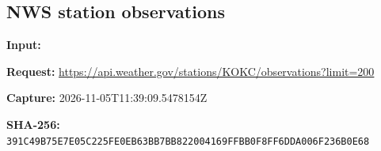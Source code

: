 \subsection{NWS station observations}
\textbf{Input:} \par
\textbf{Request:} \url{https://api.weather.gov/stations/KOKC/observations?limit=200}\par
\textbf{Capture:} 2026-11-05T11:39:09.5478154Z\par
\textbf{SHA-256:} \nolinkurl{391C49B75E7E05C225FE0EB63BB7BB822004169FFBB0F8FF6DDA006F236B0E68}\par

